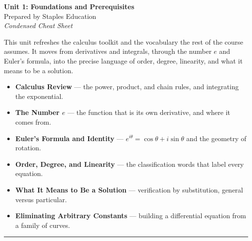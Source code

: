 \documentclass[11pt]{article}
\begin{document}
\begin{center}
    {\LARGE \bfseries Unit 1: Foundations and Prerequisites}\\[6pt]
    {\large Prepared by Staples Education}\\[4pt]
    {\itshape Condensed Cheat Sheet}
\end{center}

\vspace{0.4em}

\begin{topicsbox}
This unit refreshes the calculus toolkit and the vocabulary the rest of the
course assumes. It moves from derivatives and integrals, through the number $e$
and Euler's formula, into the precise language of order, degree, linearity, and
what it means to be a solution.
\begin{itemize}[leftmargin=1.4em, itemsep=3pt]
    \item \textbf{Calculus Review} --- the power, product, and chain rules, and
          integrating the exponential.
    \item \textbf{The Number $e$} --- the function that is its own derivative,
          and where it comes from.
    \item \textbf{Euler's Formula and Identity} --- $e^{i\theta} = \cos\theta +
          i\sin\theta$ and the geometry of rotation.
    \item \textbf{Order, Degree, and Linearity} --- the classification words
          that label every equation.
    \item \textbf{What It Means to Be a Solution} --- verification by
          substitution, general versus particular.
    \item \textbf{Eliminating Arbitrary Constants} --- building a differential
          equation from a family of curves.
\end{itemize}
\end{topicsbox}

\vspace{0.6em}
\hrule
\vspace{0.6em}

\end{document}
